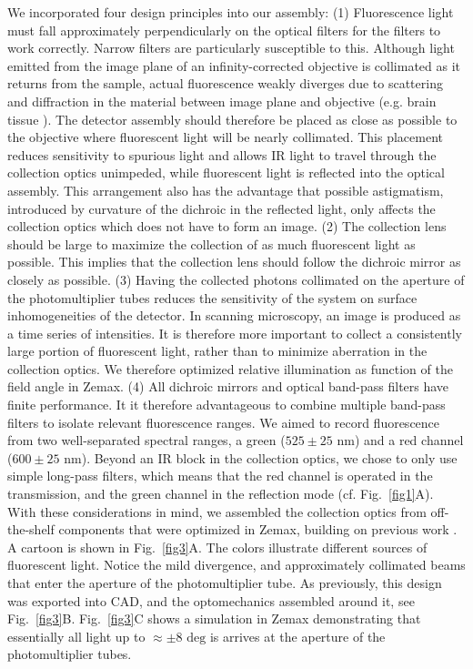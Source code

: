 \documentclass[10pt,letterpaper]{article}
\begin{document}
%
We incorporated four design principles into our assembly: (1) Fluorescence light must fall approximately perpendicularly on the optical filters for the filters to work correctly. Narrow filters are particularly susceptible to this. Although light emitted from the image plane of an infinity-corrected objective is collimated as it returns from the sample, actual fluorescence weakly diverges due to scattering and diffraction in the material between image plane and objective (e.g. brain tissue \cite{Zipfel2003, Taddeucci1996}). The detector assembly should therefore be placed as close as possible to the objective where fluorescent light will be nearly collimated. This placement reduces sensitivity to spurious light and allows IR light to travel through the collection optics unimpeded, while fluorescent light is reflected into the optical assembly. This arrangement also has the advantage that possible astigmatism, introduced by curvature of the dichroic in the reflected light, only affects the collection optics which does not have to form an image. (2) The collection lens should be large to maximize the collection of as much fluorescent light as possible. This implies that the collection lens should follow the dichroic mirror as closely as possible. (3) Having the collected photons collimated on the aperture of the photomultiplier tubes reduces the sensitivity of the system on surface inhomogeneities of the detector\cite{Tsai2002, Young2015}. In scanning microscopy, an image is produced as a time series of intensities. It is therefore more important to collect a consistently large portion of fluorescent light, rather than to minimize aberration in the collection optics. We therefore optimized relative illumination as function of the field angle in Zemax. (4) All dichroic mirrors and optical band-pass filters have finite performance. It it therefore advantageous to combine multiple band-pass filters to isolate relevant fluorescence ranges. We aimed to record fluorescence from two well-separated spectral ranges, a green ($525\pm25\text{ nm}$) and a red channel ($600\pm25\text{ nm}$). Beyond an IR block in the collection optics, we chose to only use simple long-pass filters, which means that the red channel is operated in the transmission, and the green channel in the reflection mode (cf. Fig.~\ref{fig1}A).\newline
With these considerations in mind, we assembled the collection optics from off-the-shelf components that were optimized in Zemax, building on previous work \cite{Tsai2002,Tsai2015}. A cartoon is shown in Fig.~\ref{fig3}A. The colors illustrate different sources of fluorescent light. Notice the mild divergence, and approximately collimated beams that enter the aperture of the photomultiplier tube. As previously, this design was exported into CAD, and the optomechanics assembled around it, see Fig.~\ref{fig3}B. Fig.~\ref{fig3}C shows a simulation in Zemax demonstrating that essentially all light up to $\approx\pm 8\text{ deg}$ is arrives at the aperture of the photomultiplier tubes.
\end{document}
